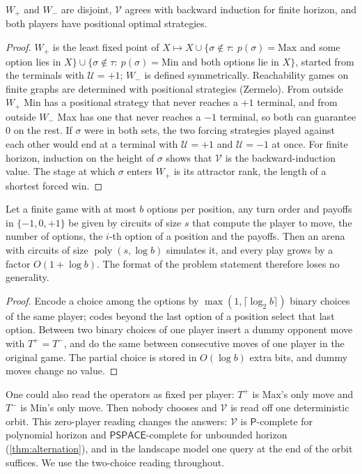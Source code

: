 \documentclass[final]{siamart0516}
\numberwithin{theorem}{section}
\numberwithin{equation}{section}
\theoremstyle{siamnonum}
\theoremstyle{plain}
\newcommand{\val}{\mathcal{V}}            %
\newcommand{\pay}{\mathcal{U}}            %
\newcommand{\poly}{\operatorname{poly}}
\newcommand{\cls}[1]{\mathsf{#1}}
\newcommand{\PSPACE}{\cls{PSPACE}}
\newcommand{\Pclass}{\cls{P}}
\begin{document}
\begin{lemma}\label{lem:well-defined}
$W_{+}$ and $W_{-}$ are disjoint, $\val$ agrees with backward induction for finite horizon, and both players have positional optimal strategies.
\end{lemma}

\begin{proof}
$W_{+}$ is the least fixed point of $X\mapsto X\cup\{\sigma\notin\tau:\ p(\sigma)=\mathrm{Max}$ and some option lies in $X\}\cup\{\sigma\notin\tau:\ p(\sigma)=\mathrm{Min}$ and both options lie in $X\}$, started from the terminals with $\pay=+1$; $W_{-}$ is defined symmetrically. Reachability games on finite graphs are determined with positional strategies (Zermelo). From outside $W_{+}$ Min has a positional strategy that never reaches a $+1$ terminal, and from outside $W_{-}$ Max has one that never reaches a $-1$ terminal, so both can guarantee $0$ on the rest. If $\sigma$ were in both sets, the two forcing strategies played against each other would end at a terminal with $\pay=+1$ and $\pay=-1$ at once. For finite horizon, induction on the height of $\sigma$ shows that $\val$ is the backward-induction value. The stage at which $\sigma$ enters $W_{+}$ is its attractor rank, the length of a shortest forced win.
\end{proof}

\begin{lemma}\label{lem:normal-form}
Let a finite game with at most $b$ options per position, any turn order and payoffs in $\{-1,0,+1\}$ be given by circuits of size $s$ that compute the player to move, the number of options, the $i$-th option of a position and the payoffs. Then an arena with circuits of size $\poly(s,\log b)$ simulates it, and every play grows by a factor $O(1+\log b)$. The format of the problem statement therefore loses no generality.
\end{lemma}

\begin{proof}
Encode a choice among the options by $\max(1,\lceil\log_2 b\rceil)$ binary choices of the same player; codes beyond the last option of a position select that last option. Between two binary choices of one player insert a dummy opponent move with $T^{+}=T^{-}$, and do the same between consecutive moves of one player in the original game. The partial choice is stored in $O(\log b)$ extra bits, and dummy moves change no value.
\end{proof}

One could also read the operators as fixed per player: $T^{+}$ is Max's only move and $T^{-}$ is Min's only move. Then nobody chooses and $\val$ is read off one deterministic orbit. This zero-player reading changes the answers: $\val$ is $\Pclass$-complete for polynomial horizon and $\PSPACE$-complete for unbounded horizon (\cref{thm:alternation}), and in the landscape model one query at the end of the orbit suffices. We use the two-choice reading throughout.
\end{document}
